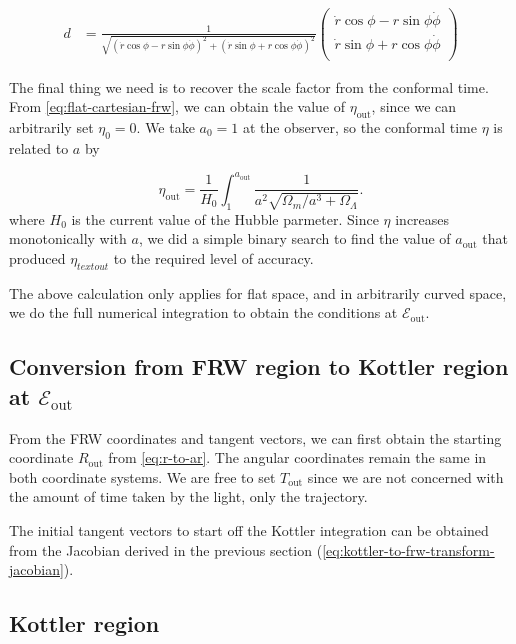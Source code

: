 \begin{align}
    d &= \frac{1}{\sqrt{(\dot{r}\cos\phi - r\sin\phi\dot{\phi})^2 + (\dot{r}\sin\phi + r\cos\phi\dot{\phi})^2}}
          \begin{pmatrix}
           \dot{r}\cos\phi - r\sin\phi\dot{\phi} \\
           \dot{r}\sin\phi + r\cos\phi\dot{\phi} \\
         \end{pmatrix}
\end{align}

The final thing we need is to recover the scale factor from the conformal time. From \autoref{eq:flat-cartesian-frw}, we can obtain the value of $\eta_{\text{out}}$, since we can arbitrarily set $\eta_0 = 0$. We take $a_0 = 1$ at the observer, so the conformal time $\eta$ is related to $a$ by

\begin{equation}
  \eta_{\text{out}} = \frac{1}{H_0} \int_1^{a_{\text{out}}} \frac{1}{a^2 \sqrt{\Omega_m/a^3 + \Omega_{\Lambda}}}.
  \label{eq:conformal-time-eta-to-a-integral}
\end{equation}
where $H_0$ is the current value of the Hubble parmeter. Since $\eta$ increases monotonically with $a$, we did a simple binary search to find the value of $a_{\text{out}}$ that produced $\eta_{text{out}}$ to the required level of accuracy. 

The above calculation only applies for flat space, and in arbitrarily curved space, we do the full numerical integration to obtain the conditions at $\mathcal{E}_{\text{out}}$.

\subsection{Conversion from FRW region to Kottler region at $\mathcal{E}_{\text{out}}$}
\label{subsec:frw-to-kottler}

From the FRW coordinates and tangent vectors, we can first obtain the starting coordinate $R_{\text{out}}$ from \autoref{eq:r-to-ar}. The angular coordinates remain the same in both coordinate systems. We are free to set $T_{\text{out}}$ since we are not concerned with the amount of time taken by the light, only the trajectory. 

The initial tangent vectors to start off the Kottler integration can be obtained from the Jacobian derived in the previous section (\autoref{eq:kottler-to-frw-transform-jacobian}).

\subsection{Kottler region}

